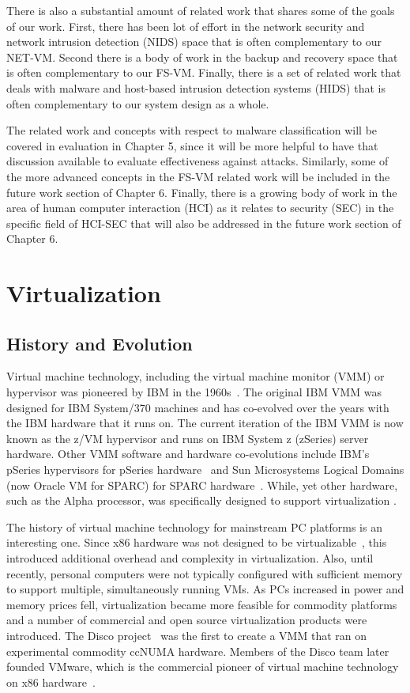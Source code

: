 There is also a substantial amount of related work that shares some of the goals of our work. First, there has been lot of effort in the network security and network intrusion detection (NIDS) space that is often complementary to our NET-VM. Second there is a body of work in the backup and recovery space that is often complementary to our FS-VM. Finally, there is a set of related work that deals with malware and host-based intrusion detection systems (HIDS) that is often complementary to our system design as a whole.

The related work and concepts with respect to malware classification will be covered in evaluation in Chapter 5, since it will be more helpful to have that discussion available to evaluate effectiveness against attacks. Similarly, some of the more advanced concepts in the FS-VM related work will be included in the future work section of Chapter 6. Finally, there is a growing body of work in the area of human computer interaction (HCI) as it relates to security (SEC) in the specific field of HCI-SEC that will also be addressed in the future work section of Chapter 6.


\section{Virtualization}

\subsection{History and Evolution}

Virtual machine technology, including the virtual machine monitor (VMM) or hypervisor was pioneered by IBM in the 1960s~\cite{creasy_1981}. The original IBM VMM was designed for IBM System/370 machines and has co-evolved over the years with the IBM hardware that it runs on.  The current iteration of the IBM VMM is now known as the z/VM hypervisor and runs on IBM System z (zSeries) server hardware. Other VMM software and hardware co-evolutions include IBM's pSeries hypervisors for pSeries hardware~\cite{armstrong_power5_2005,blank_p5_2005} and Sun Microsystems Logical Domains (now Oracle VM for SPARC) for SPARC hardware~\cite{sparc_architecture_2005,sparc_vm_2006}. While, yet other hardware, such as the Alpha processor, was specifically designed to support virtualization \cite{karger_2007}. 

The history of virtual machine technology for mainstream PC platforms is an interesting one. Since x86 hardware was not designed to be virtualizable~\cite{popek_1974}, this introduced additional overhead and complexity in virtualization. Also, until recently, personal computers were not typically configured with sufficient memory to support multiple, simultaneously running VMs.  As PCs increased in power and memory prices fell, virtualization became more feasible for commodity platforms and a number of commercial and open source virtualization products were introduced. The Disco project~\cite{bugnion_1997} was the first to create a VMM that ran on experimental commodity ccNUMA hardware. Members of the Disco team later founded VMware, which is the commercial pioneer of virtual machine technology on x86 hardware~\cite{vmware_website,adams_2006}.
 
